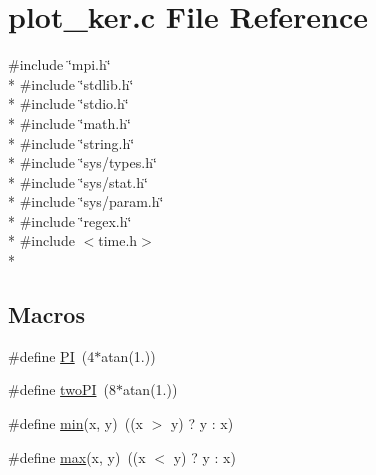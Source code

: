 \section{plot\-\_\-ker.\-c File Reference}
\label{plot__ker_8c}
{\ttfamily \#include \char`\"{}mpi.\-h\char`\"{}}\\*
{\ttfamily \#include \char`\"{}stdlib.\-h\char`\"{}}\\*
{\ttfamily \#include \char`\"{}stdio.\-h\char`\"{}}\\*
{\ttfamily \#include \char`\"{}math.\-h\char`\"{}}\\*
{\ttfamily \#include \char`\"{}string.\-h\char`\"{}}\\*
{\ttfamily \#include \char`\"{}sys/types.\-h\char`\"{}}\\*
{\ttfamily \#include \char`\"{}sys/stat.\-h\char`\"{}}\\*
{\ttfamily \#include \char`\"{}sys/param.\-h\char`\"{}}\\*
{\ttfamily \#include \char`\"{}regex.\-h\char`\"{}}\\*
{\ttfamily \#include $<$time.\-h$>$}\\*
\subsection*{Macros}
\begin{DoxyCompactItemize}
\item 
\#define \hyperlink{plot__ker_8c_a598a3330b3c21701223ee0ca14316eca}{P\-I}~(4$\ast$atan(1.))
\item 
\#define \hyperlink{plot__ker_8c_a0a3527f8b23535fe43972fbe88c3cc0d}{two\-P\-I}~(8$\ast$atan(1.))
\item 
\#define \hyperlink{plot__ker_8c_abb702d8b501669a23aa0ab3b281b9384}{min}(x, y)~((x $>$ y) ? y \-: x)
\item 
\#define \hyperlink{plot__ker_8c_ac39d9cef6a5e030ba8d9e11121054268}{max}(x, y)~((x $<$ y) ? y \-: x)
\end{DoxyCompactItemize}
